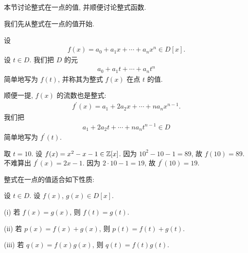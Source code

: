\subsection*{\ValueOfAPolynomialAtAPoint}
\markright{\ValueOfAPolynomialAtAPoint}

本节讨论整式在一点的值, 并顺便讨论整式函数.

我们先从整式在一点的值开始.

\begin{definition}
    设
    \begin{align*}
        f(x) = a_0 + a_1 x + \cdots + a_n x^n \in D[x].
    \end{align*}
    设 $t \in D$. 我们把 $D$ 的元
    \begin{align*}
        a_0 + a_1 t + \cdots + a_n t^n
    \end{align*}
    简单地写为 $f(t)$, 并称其为整式 $f(x)$ 在点  $t$ 的值.

    顺便一提, $f(x)$ 的流数也是整式:
    \begin{align*}
        f^{\prime} (x) = a_1 + 2a_2 x + \cdots + na_n x^{n-1}.
    \end{align*}
    我们把
    \begin{align*}
        a_1 + 2a_2 t + \cdots + na_n t^{n-1} \in D
    \end{align*}
    简单地写为 $f^{\prime} (t)$.
\end{definition}

\begin{example}
    取 $t = 10$. 设 $f(x) = x^2 - x - 1 \in \mathbb{Z}[x]$. 因为 $10^2 - 10 - 1 = 89$, 故 $f(10) = 89$. 不难算出 $f^{\prime} (x) = 2x - 1$. 因为 $2 \cdot 10 - 1 = 19$, 故 $f^{\prime} (10) = 19$.
\end{example}

整式在一点的值适合如下性质:
\begin{proposition}
    设 $t \in D$. 设 $f(x)$, $g(x) \in D[x]$.

    (i) 若 $f(x) = g(x)$, 则 $f(t) = g(t)$.

    (ii) 若 $p(x) = f(x) + g(x)$, 则 $p(t) = f(t) + g(t)$.

    (iii) 若 $q(x) = f(x) g(x)$, 则 $q(t) = f(t) g(t)$.
\end{proposition}


